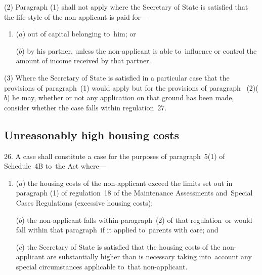 \documentclass[12pt,a4paper]{article}
\begin{document}
%
%

(2) Paragraph (1) shall not apply where the Secretary of State is satisfied that the life-style of the non-applicant is paid for—
\begin{enumerate}\item[]
($a$) out of capital belonging to~him; or

($b$) by his partner, unless the non-applicant is able to~influence or control the amount of income received by that partner.
\end{enumerate}

(3) Where the Secretary of State is satisfied in a particular case that the provisions of paragraph~(1) would apply but for the provisions of paragraph~%
(2)($b$)  %
he may, whether or not any application on that ground has been made, consider whether the case falls within regulation~27.


\subsection[26. Unreasonably high housing costs]{Unreasonably high housing costs}

26. A case shall constitute a case for the
purposes of paragraph~5(1) of Schedule~4B to~the Act where—
\begin{enumerate}\item[]
($a$) the housing costs of the non-applicant exceed the limits set out in paragraph
(1) of regulation~18 of the Maintenance Assessments and~Special Cases
Regulations (excessive housing costs);

($b$) the non-applicant falls within paragraph~(2) of that regulation~or would fall
within that paragraph~if it applied to~parents with care; and

($c$) the Secretary of State is satisfied that the housing costs of the
non-applicant are substantially higher than is necessary taking into~account any
special circumstances applicable to~that non-applicant.
\end{enumerate}
\end{document}

